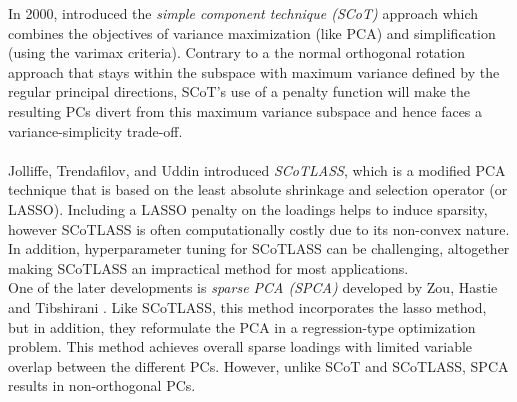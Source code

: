 \documentclass[11pt,letterpaper]{report}
\begin{document}
In 2000, \citeauthor{Jolliffe2000} introduced the \textit{simple component technique (SCoT)} approach which combines the objectives of variance maximization (like PCA) and simplification (using the varimax criteria). Contrary to a the normal orthogonal rotation approach that stays within the subspace with maximum variance defined by the regular principal directions, SCoT's use of a penalty function will make the resulting PCs divert from this maximum variance subspace and hence faces a variance-simplicity trade-off.\\
\\
Jolliffe, Trendafilov, and Uddin \citeyear{Jolliffe2003} introduced \textit{SCoTLASS}, which is a modified PCA technique that is based on the least absolute shrinkage and selection operator (or LASSO). Including a LASSO penalty on the loadings helps to induce sparsity, however SCoTLASS is often computationally costly due to its non-convex nature. In addition, hyperparameter tuning for SCoTLASS can be challenging, altogether making SCoTLASS an impractical method for most applications.\\

One of the later developments is \textit{sparse PCA (SPCA)} developed by Zou, Hastie and Tibshirani \citeyear{Zou2006}. Like SCoTLASS, this method incorporates the lasso method, but in addition, they reformulate the PCA in a regression-type optimization problem. This method achieves overall sparse loadings with limited variable overlap between the different PCs. However, unlike SCoT and SCoTLASS, SPCA results in non-orthogonal PCs.\\

\end{document}
